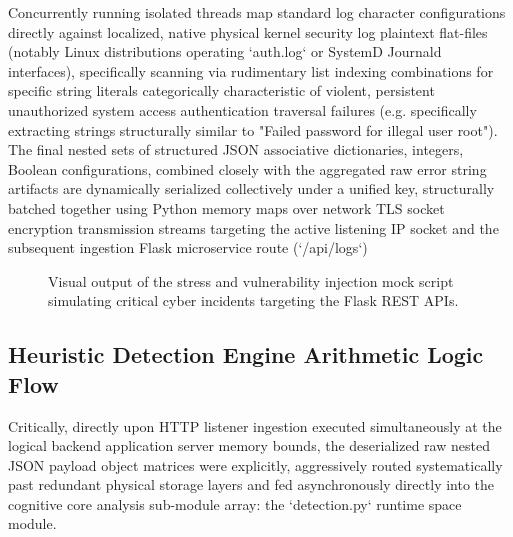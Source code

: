 Concurrently running isolated threads map standard log character configurations directly against localized, native physical kernel security log plaintext flat-files (notably Linux distributions operating `auth.log` or SystemD Journald interfaces), specifically scanning via rudimentary list indexing combinations for specific string literals categorically characteristic of violent, persistent unauthorized system access authentication traversal failures (e.g. specifically extracting strings structurally similar to "Failed password for illegal user root"). The final nested sets of structured JSON associative dictionaries, integers, Boolean configurations, combined closely with the aggregated raw error string artifacts are dynamically serialized collectively under a unified key, structurally batched together using Python memory maps over network TLS socket encryption transmission streams targeting the active listening IP socket and the subsequent ingestion Flask microservice route (`/api/logs`)

\begin{figure}[h]
    \centering
    \caption{Visual output of the stress and vulnerability injection mock script simulating critical cyber incidents targeting the Flask REST APIs.}
    \label{fig:stresstest}
\end{figure}

\subsection{Heuristic Detection Engine Arithmetic Logic Flow}
Critically, directly upon HTTP listener ingestion executed simultaneously at the logical backend application server memory bounds, the deserialized raw nested JSON payload object matrices were explicitly, aggressively routed systematically past redundant physical storage layers and fed asynchronously directly into the cognitive core analysis sub-module array: the `detection.py` runtime space module. 

